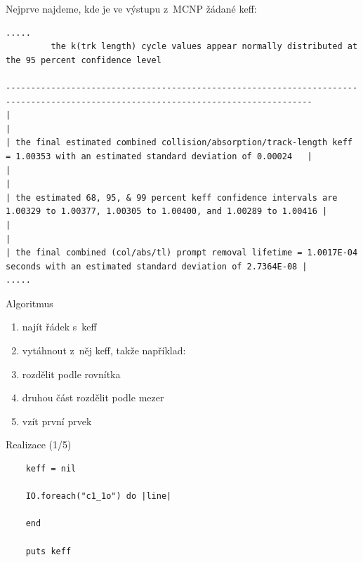 \documentclass{beamer}
\begin{document}
\begin{frame}[fragile]{}
  Nejprve najdeme, kde je ve výstupu z~MCNP žádané keff:
  {\tiny
  \begin{verbatim}
.....
         the k(trk length) cycle values appear normally distributed at the 95 percent confidence level

-----------------------------------------------------------------------------------------------------------------------------------
|                                                                                                                                 |
| the final estimated combined collision/absorption/track-length keff = 1.00353 with an estimated standard deviation of 0.00024   |
|                                                                                                                                 |
| the estimated 68, 95, & 99 percent keff confidence intervals are 1.00329 to 1.00377, 1.00305 to 1.00400, and 1.00289 to 1.00416 |
|                                                                                                                                 |
| the final combined (col/abs/tl) prompt removal lifetime = 1.0017E-04 seconds with an estimated standard deviation of 2.7364E-08 |
.....
  \end{verbatim}
  }
\end{frame}

\begin{frame}{Algoritmus}
  \begin{enumerate}
    \item najít řádek s~keff
    \pause
    \item vytáhnout z~něj keff, takže například:
    \pause
    \item rozdělit podle rovnítka
    \pause
    \item druhou část rozdělit podle mezer
    \pause
    \item vzít první prvek
  \end{enumerate}
\end{frame}


\begin{frame}[fragile]{Realizace (1/5)}
  \scriptsize
  \begin{verbatim}
    keff = nil

    IO.foreach("c1_1o") do |line|

    end

    puts keff
  \end{verbatim}
\end{frame}
\end{document}
